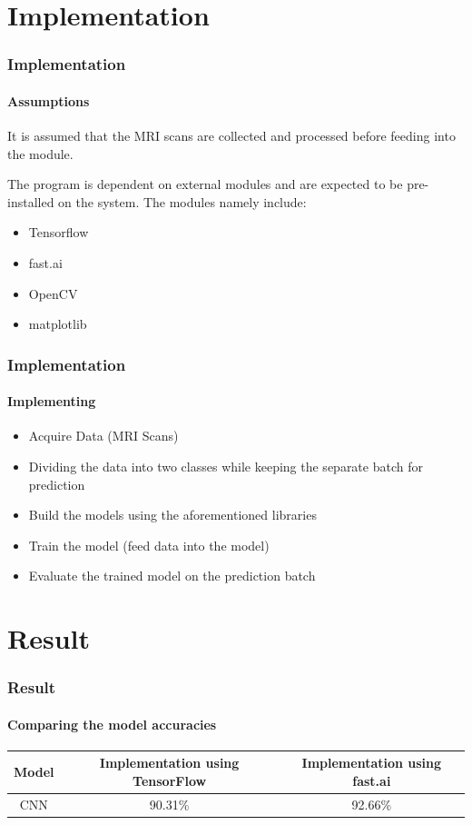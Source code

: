 \documentclass[10pt, aspectratio=169]{beamer}
\begin{document}
	\section{Implementation}

	\begin{frame}
		\frametitle{Implementation}
		\framesubtitle{Assumptions}

		It is assumed that the MRI scans are collected and processed before
		feeding into the module.

		\vspace{1cm}

		The program is dependent on external modules and are expected to be
		pre-installed on the system. The modules namely include:

		\vspace{1cm}

		\begin{itemize}
			\item Tensorflow
			\item fast.ai
			\item OpenCV
			\item matplotlib
		\end{itemize}
	\end{frame}

	\begin{frame}
		\frametitle{Implementation}
		\framesubtitle{Implementing}

		\begin{itemize}
			\item Acquire Data (MRI Scans)
			\item Dividing the data into two classes while keeping the separate
				batch for prediction
			\item Build the models using the aforementioned libraries
			\item Train the model (feed data into the model)
			\item Evaluate the trained model on the prediction batch
		\end{itemize}
	\end{frame}

	\section{Result}

	\begin{frame}
		\frametitle{Result}
		\framesubtitle{Comparing the model accuracies}

		\begin{center}
			\begin{tabular}{| c | c | c |}
				\hline
				Model & Implementation using TensorFlow & Implementation using
				fast.ai \\
				\hline
				CNN & 90.31\% & 92.66\% \\
				\hline
			\end{tabular}
		\end{center}
	\end{frame}
\end{document}
